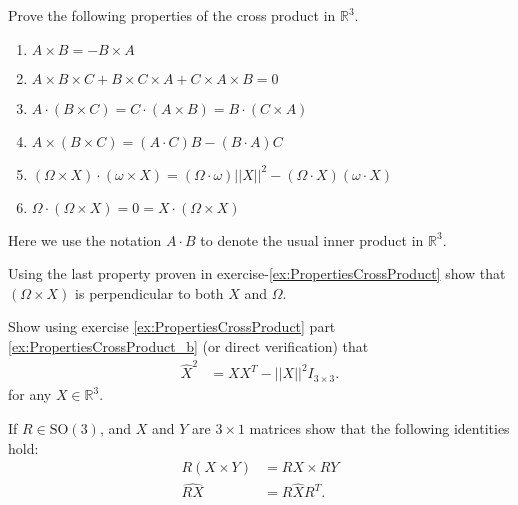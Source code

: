 \documentclass[graybox,envcountchap,sectrefs]{svmonoMuga}
\begin{document}
\begin{exercise}\label{ex:PropertiesCrossProduct} Prove the following properties of the cross product in $\mathbb{R}^3$.
\begin{enumerate}
\item $A\times B=-B\times A$
\item $A\times B\times C+B\times C\times A+C\times A\times B=0$
\item $A\cdot(B\times C)=C\cdot(A \times B)=B\cdot(C \times A)$
\item $A\times(B\times C)=(A\cdot C)B-(B\cdot A)C$ \label{ex:PropertiesCrossProduct_b}
\item $(\Omega\times X)\cdot(\omega\times X)=(\Omega \cdot \omega)||X||^2-(\Omega \cdot X)(\omega \cdot X)$
\item $\Omega \cdot (\Omega \times X)=0=X\cdot(\Omega \times X)$
\end{enumerate}
Here we use the notation $A\cdot B$ to denote the usual inner product in $\mathbb{R}^3$.
\end{exercise}


\begin{exercise}
Using the last property proven in exercise-\ref{ex:PropertiesCrossProduct} show that $(\Omega \times X)$ is perpendicular to both $X$ and $\Omega$.
\end{exercise}
\begin{exercise}\label{ex:XhatSqrd}
Show using exercise \ref{ex:PropertiesCrossProduct} part \ref{ex:PropertiesCrossProduct_b} (or direct verification) that
\begin{align*}
\widehat{X}^2&= XX^T-||X||^2I_{3\times3}. 
\end{align*}
for any $X\in \mathbb{R}^3$.
\end{exercise}


\begin{exercise}\label{ex:RotaedCrossProduct}
If $R\in \mathrm{SO}(3)$, and $X$ and $Y$ are $3\times 1$ matrices show that the following identities hold:
\begin{align*}
R(X\times Y)&=RX\times RY\\
\widehat{RX}&=R\widehat{X}R^T.
\end{align*}
\end{exercise}


\end{document}
